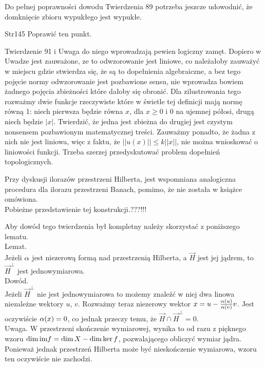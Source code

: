 \documentclass[a4paper,11pt]{article}
\newcommand{\im}{\tr{im}}
\begin{document}
\vspace{\spaceFour}


\start {} Do pełnej poprawności dowodu Twierdzenia 89 potrzeba
jeszcze udowodnić, że domknięcie zbioru wypukłego jest wypukłe.

\vspace{\spaceFour}


\start Str{145} Poprawić ten punkt.

\vspace{\spaceFour}


\start {} Twierdzenie 91 i Uwaga do niego wprowadzają pewien
logiczny zamęt. Dopiero w Uwadze jest zauważone, ze to odwzorowanie
jest liniowe, co należałoby zauważyć w miejscu gdzie stwierdza się, że
są to dopełnienia algebraiczne, a bez tego pojęcie normy odwzorowanie
jest pozbawione sensu, nie wprowadza bowiem żadnego pojęcia zbieżności
które dałoby się obronić. Dla zilustrowania tego rozważmy dwie funkcje
rzeczywiste które w świetle tej definicji mają normę równą 1: niech
pierwsza będzie równa $x$, dla $x \geq 0$ i 0 na ujemnej półosi, drugą
niech będzie $| x |$. Twierdzić, że jedna jest zbieżna do drugiej jest
czystym nonsensem pozbawionym matematycznej treści. Zauważmy ponadto,
że żadna z nich nie jest liniowa, więc z faktu, że
$|| u( x ) || \leq k || x ||$, nie można wnioskować o liniowości
funkcji. Trzeba szerzej przedyskutować problem dopełnień
topologicznych.

\vspace{\spaceFour}


\start {} Przy dyskusji ilorazów przestrzeni Hilberta, jest
wspomniana analogiczna procedura dla ilorazu przestrzeni Banach,
pomimo, że nie została w książce omówiona. \\
Pobieżne przedstawienie tej konstrukcji.???!!!

\vspace{\spaceFour}


\start {} Aby dowód tego twierdzenia był kompletny należy
skorzystać z poniższego lematu. \\
Lemat. \\
Jeżeli $\alpha$ jest niezerową formą nad przestrzenią Hilberta, a
$\vec{ H }$
jest jej jądrem, to $\vec{ H }^{ \bot }$ jest jednowymiarowa. \\
Dowód. \\
Jeżeli $\vec{ H }^{ \bot }$ nie jest jednowymiarowa to możemy znaleźć
w niej dwa linowa niezależne wektory $u$, $v$. Rozważmy teraz
niezerowy wektor $x = u -\frac{ \alpha( u ) }{ \alpha( v ) }v$. Jest
oczywiście $\alpha( x ) = 0$,
co jednak przeczy temu, że $\vec{ H } \cap \vec{ H }^{ \bot } =  0$. \\
Uwaga. W przestrzeni skończenie wymiarowej, wynika to od razu z
pięknego wzoru $\dim\im f = \dim X - \dim\ker f$, pozwalającego
obliczyć wymiar jądra. Ponieważ jednak przestrzeń Hilberta może być
nieskończenie wymiarowa, wzoru ten oczywiście nie zachodzi.
\end{document}
